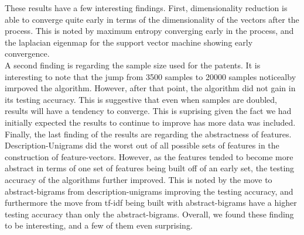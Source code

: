 These results have a few interesting findings.  First, dimensionality reduction is able to converge quite early in terms of the dimensionality of the vectors after the process.  This is noted by maximum entropy converging early in the process, and the laplacian eigenmap for the support vector machine showing early convergence.  
\\A second finding is regarding the sample size used for the patents.  It is interesting to note that the jump from 3500 samples to 20000 samples noticealby imrpoved the algorithm.  However, after that point, the algorithm did not gain in its testing accuracy.  This is suggestive that even when samples are doubled, results will have a tendency to converge.  This is suprising given the fact we had initially expected the results to continue to improve has more data was included.
\\Finally, the last finding of the results are regarding the abstractness of features.  Description-Unigrams did the worst out of all possible sets of features in the construction of feature-vectors.  However, as the features tended to become more abstract in terms of one set of features being built off of an early set, the testing accuracy of the algorithms further improved.  This is noted by the move to abstract-bigrams from description-unigrams improving the testing accuracy, and furthermore the move from tf-idf being built with abstract-bigrams have a higher testing accuracy than only the abstract-bigrams. Overall, we found these finding to be interesting, and a few of them even surprising.